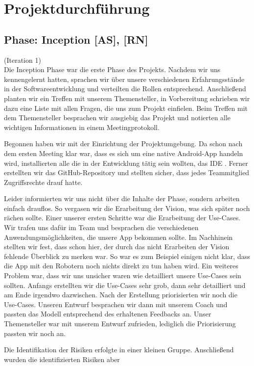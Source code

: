 \documentclass[10pt]{article}
\begin{document}
\newpage
\section{Projektdurchführung}
\subsection{Phase: Inception [AS], [RN]}
(Iteration 1) \\
Die Inception Phase war die erste Phase des Projekts. Nachdem wir uns kennengelernt hatten, sprachen wir über
unsere verschiedenen Erfahrungsstände in der Softwareentwicklung und verteilten die Rollen entsprechend.
Anschließend planten wir ein Treffen
mit unserem Themensteller, in Vorbereitung schrieben wir dazu eine Liste mit allen Fragen, die uns zum Projekt einfielen.
Beim Treffen mit dem Themensteller besprachen wir ausgiebig das Projekt und notierten alle wichtigen Informationen
in einem Meetingprotokoll.\par
\medskip
Begonnen haben wir mit der Einrichtung der Projektumgebung. Da schon nach dem ersten Meeting klar war, dass es sich
um eine native Android-App handeln wird, installierten alle die in der Entwicklung tätig sein wollten, das IDE
. Ferner erstellten wir das GitHub-Repository und stellten sicher, dass jedes Teammitglied
Zugriffsrechte drauf hatte.\par
\medskip
Leider informierten wir uns nicht über die Inhalte der Phase, sondern arbeiten einfach drauflos.
So vergasen wir die Erarbeitung der Vision, was sich später noch rächen sollte.
Einer unserer ersten Schritte war die Erarbeitung der Use-Cases.
Wir trafen uns dafür im Team und besprachen die verschiedenen Anwendungsmöglichkeiten,
die unsere App bekommen sollte. Im Nachhinein stellten wir fest, dass schon hier, der durch das nicht
Erarbeiten der Vision fehlende Überblick zu merken war. So war es zum Beispiel einigen nicht klar, dass die
App mit den Robotern noch nichts direkt zu tun haben wird. Ein weiteres Problem war, dass wir uns unsicher waren
wie detailliert unsere Use-Cases sein sollten. Anfangs erstellten wir die Use-Cases sehr grob, dann sehr detailliert
und am Ende irgendwo dazwischen. Nach der Erstellung priorisierten wir noch die Use-Cases. Unseren Entwurf besprachen
wir dann mit unserem Coach und passten das Modell entsprechend des erhaltenen Feedbacks an. Unser
Themensteller war mit unserem Entwurf zufrieden, lediglich die Priorisierung passten wir noch an.\par
\medskip
Die Identifikation der Risiken erfolgte in einer kleinen Gruppe. Anschließend wurden die identifizierten Risiken aber
\end{document}
